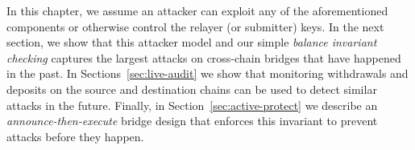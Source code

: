 





In this chapter, we assume an attacker can exploit any of the aforementioned
components or otherwise control the relayer (or submitter) keys.
In the next section, we show that this attacker model and our simple
\emph{balance invariant checking} captures the largest attacks on cross-chain
bridges that have happened in the past.  In Sections~\ref{sec:live-audit} we show
that monitoring withdrawals and deposits on the source and destination chains
can be used to detect similar attacks in the future.  Finally, in
Section~\ref{sec:active-protect} we describe an \emph{announce-then-execute} bridge
design that enforces this invariant to prevent attacks before they happen.

